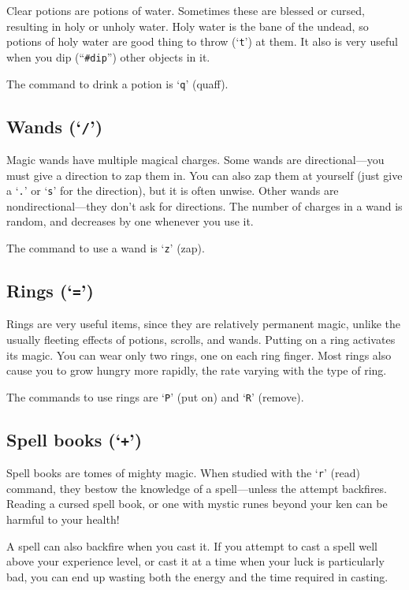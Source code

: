 Clear potions are potions of water.  Sometimes these are
blessed or cursed, resulting in holy or unholy water.  Holy water is
the bane of the undead, so potions of holy water are good thing to
throw (`{\tt t}') at them.  It also is very useful when you dip
(``{\tt \#dip}'') other
objects in it.

The command to drink a potion is `{\tt q}' (quaff).

\subsection*{Wands (`{\tt /}')}

Magic wands have multiple magical charges.  Some wands are
directional---you must give a direction to zap them in.  You can also
zap them at yourself (just give a `{\tt .}' or `{\tt s}' for the direction),
but it is often unwise.  Other wands are nondirectional---they don't ask
for directions.  The number of charges in a wand is random, and
decreases by one whenever you use it.

The command to use a wand is `{\tt z}' (zap).

\subsection*{Rings (`{\tt =}')}

Rings are very useful items, since they are relatively permanent
magic, unlike the usually fleeting effects of potions, scrolls, and
wands.
Putting on a ring activates its magic.  You can wear only two
rings, one on each ring finger.
Most rings also cause you to grow hungry more rapidly, the rate
varying with the type of ring.

The commands to use rings are `{\tt P}' (put on) and `{\tt R}' (remove).

\subsection*{Spell books (`{\tt +}')}

Spell books are tomes of mighty magic.  When studied with the `{\tt r}' (read)
command, they bestow the knowledge of a spell---unless the attempt
backfires.
Reading a cursed spell book, or one with mystic runes beyond
your ken can be harmful to your health!

A spell can also backfire when you cast it.  If you attempt to cast a
spell well above your experience level, or cast it at a time when your
luck is particularly bad, you can end up wasting both the energy and
the time required in casting.

